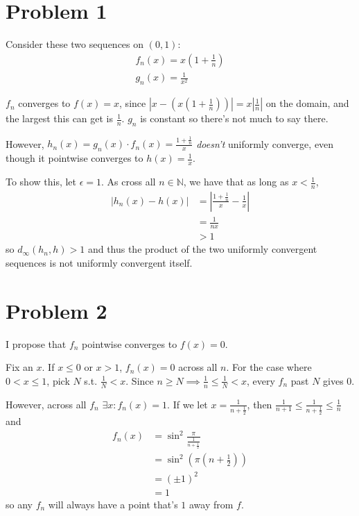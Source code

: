 \documentclass[12pt]{article}
\newcommand{\N}{\mathbb{N}}
\begin{document}
\section{Problem 1}

Consider these two sequences on $(0, 1)$:
\begin{gather*}
  f_n(x)=x\left(1+\frac{1}{n}\right) \\
  g_n(x)=\frac{1}{x^2}
\end{gather*}

$f_n$ converges to $f(x)=x$, since $\left|x-\left(x\left(1+\frac{1}{n}\right)\right)\right|=x\left|\frac{1}{n}\right|$ on the domain,
and the largest this can get is $\frac{1}{n}$.
$g_n$ is constant so there's not much to say there.

However, $h_n(x)=g_n(x) \cdot f_n(x)=\frac{1+\frac{1}{n}}{x}$ \textit{doesn't} uniformly converge,
even though it pointwise converges to $h(x)=\frac{1}{x}$.

To show this, let $\epsilon=1$.
As cross all $n \in \N$, we have that as long as $x < \frac{1}{n}$,
\begin{align*}
  |h_n(x)-h(x)|
   & = \left|\frac{1+\frac{1}{n}}{x}-\frac{1}{x}\right| \\
   & = \frac{1}{nx}                                     \\
   & > 1
\end{align*}
so $d_\infty(h_n, h) > 1$ and thus the product of the two uniformly convergent
sequences is not uniformly convergent itself.

\pagebreak

\section{Problem 2}

I propose that $f_n$ pointwise converges to $f(x)=0$.

Fix an $x$.
If $x \le 0$ or $x > 1$, $f_n(x)=0$ across all $n$.
For the case where $0 < x \le 1$, pick $N$ s.t. $\frac{1}{N} < x$.
Since $n \ge N \implies \frac{1}{n} \le \frac{1}{N} < x$, every $f_n$
past $N$ gives $0$.

However, across all $f_n$ $\exists x: f_n(x) = 1$.
If we let $x=\frac{1}{n+\frac{1}{2}}$, then $\frac{1}{n+1} \le \frac{1}{n+\frac{1}{2}} \le \frac{1}{n}$ and
\begin{align*}
  f_n(x)
   & = \sin^2 \frac{\pi}{\frac{1}{n+\frac{1}{2}}}        \\
   & = \sin^2 \left(\pi\left(n+\frac{1}{2}\right)\right) \\
   & = (\pm 1)^2                                         \\
   & = 1
\end{align*}
so any $f_n$ will always have a point that's $1$ away from $f$.
\end{document}
